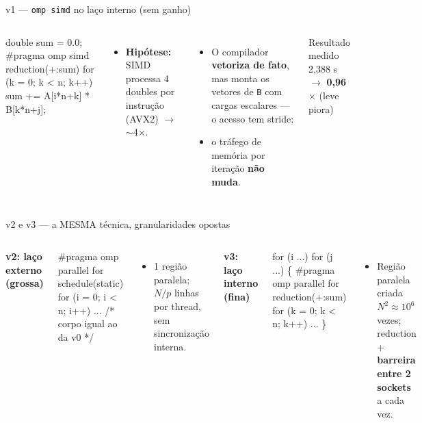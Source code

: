 \documentclass[10pt,aspectratio=169]{beamer}
\begin{document}
\begin{frame}[fragile]{v1 --- \texttt{omp simd} no laço interno (sem ganho)}
  \begin{columns}[T]
\begin{semiverbatim}\small
double sum = 0.0;
#pragma omp simd reduction(+:sum)
for (k = 0; k < n; k++)
  sum += A[i*n+k] * B[k*n+j];
\end{semiverbatim}
      \begin{itemize}
        \item \textbf{Hipótese:} SIMD processa 4 doubles por instrução (AVX2) $\rightarrow$ $\sim$4$\times$.
      \end{itemize}
      \begin{itemize}
        \item O compilador \textbf{vetoriza de fato}, mas monta os vetores de \texttt{B} com cargas escalares --- o acesso tem stride;
        \item o tráfego de memória por iteração \textbf{não muda}.
      \end{itemize}
      \begin{alertblock}{Resultado medido}
        2,388 s $\rightarrow$ \textbf{0,96$\times$} (leve piora)
      \end{alertblock}
  \end{columns}
\end{frame}

\begin{frame}[fragile]{v2 e v3 --- a MESMA técnica, granularidades opostas}
  \begin{columns}[T]
      \textbf{v2: laço externo (grossa)}
\begin{semiverbatim}\small
#pragma omp parallel for \\
        schedule(static)
for (i = 0; i < n; i++)
  ... /* corpo igual ao da v0 */
\end{semiverbatim}
      \begin{itemize}
        \item 1 região paralela; $N/p$ linhas por thread, sem sincronização interna.
      \end{itemize}
      \textbf{v3: laço interno (fina)}
\begin{semiverbatim}\small
for (i ...) for (j ...) \{
#pragma omp parallel for \\
        reduction(+:sum)
  for (k = 0; k < n; k++) ...
\}
\end{semiverbatim}
      \begin{itemize}
        \item Região paralela criada $N^2 \approx 10^6$ vezes; reduction + \textbf{barreira entre 2 sockets} a cada vez.
      \end{itemize}
  \end{columns}
\end{frame}
\end{document}
